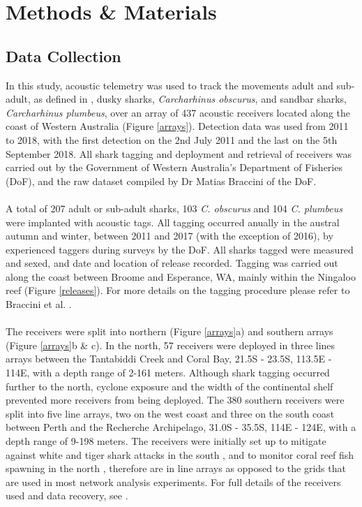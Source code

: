 \documentclass[11pt,a4paper]{article}
\begin{document}
	
	\newpage
	
	\section{Methods \& Materials}
	
	\subsection{Data Collection}
	
	In this study, acoustic telemetry was used to track the movements adult and sub-adult, as defined in \citealt{Braccini2017}, dusky sharks, \textit{Carcharhinus obscurus}, and sandbar sharks, \textit{Carcharhinus plumbeus}, over an array of 437 acoustic receivers located along the coast of Western Australia (Figure \ref{arrays}). Detection data was used from 2011 to 2018, with the first detection on the 2nd July 2011 and the last on the 5th September 2018. All shark tagging and deployment and retrieval of receivers was carried out by the Government of Western Australia’s Department of Fisheries (DoF), and the raw dataset compiled by Dr Matias Braccini of the DoF.\\
	\\
	A total of 207 adult or sub-adult sharks, 103 \textit{C. obscurus} and 104 \textit{C. plumbeus} were implanted with acoustic tags. All tagging occurred anually in the austral autumn and winter, between 2011 and 2017 (with the exception of 2016), by experienced taggers during surveys by the DoF. All sharks tagged were measured and sexed, and date and location of release recorded. Tagging was carried out along the coast between Broome and Esperance, WA, mainly within the Ningaloo reef (Figure \ref{releases}). For more details on the tagging procedure please refer to Braccini et al. \citeyear{Braccini2017c}.\\
	\\  
	The receivers were split into northern (Figure \ref{arrays}a) and southern arrays (Figure \ref{arrays}b \& c). In the north, 57 receivers were deployed in three lines arrays between the Tantabiddi Creek and Coral Bay, 21.5\degree S - 23.5\degree S, 113.5\degree E - 114\degree E, with a depth range of 2-161 meters. Although shark tagging occurred further to the north, cyclone exposure and the width of the continental shelf prevented more receivers from being deployed. The 380 southern receivers were split into five line arrays, two on the west coast and three on the south coast between Perth and the Recherche Archipelago, 31.0\degree S - 35.5\degree S, 114\degree E - 124\degree E, with a depth range of 9-198 meters. The receivers were initially set up to mitigate against white and tiger shark attacks in the south \citep{McAuley2016}, and to monitor coral reef fish spawning in the north \citep{Babcock2017}, therefore are in line arrays as opposed to the grids that are used in most network analysis experiments. For full details of the receivers used and data recovery, see \citealt{Braccini2017c,Braccini2017b}.\\
\end{document}
